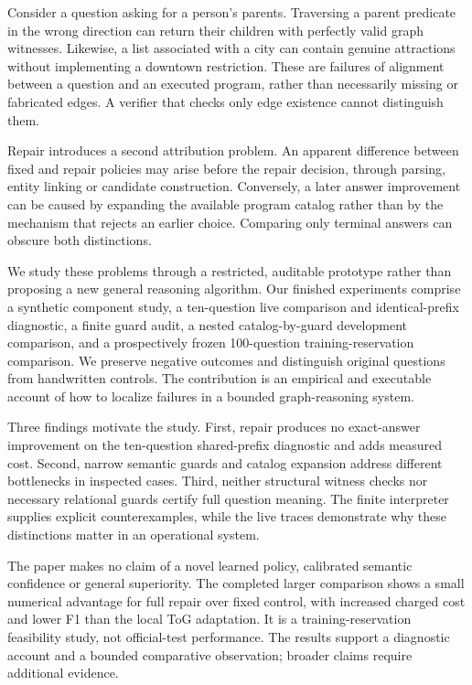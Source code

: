 \documentclass[10pt]{article}
\begin{document}
Consider a question asking for a person's parents. Traversing a parent predicate in the wrong direction can return their children with perfectly valid graph witnesses. Likewise, a list associated with a city can contain genuine attractions without implementing a downtown restriction. These are failures of alignment between a question and an executed program, rather than necessarily missing or fabricated edges. A verifier that checks only edge existence cannot distinguish them.\par

Repair introduces a second attribution problem. An apparent difference between fixed and repair policies may arise before the repair decision, through parsing, entity linking or candidate construction. Conversely, a later answer improvement can be caused by expanding the available program catalog rather than by the mechanism that rejects an earlier choice. Comparing only terminal answers can obscure both distinctions.\par

We study these problems through a restricted, auditable prototype rather than proposing a new general reasoning algorithm. Our finished experiments comprise a synthetic component study, a ten-question live comparison and identical-prefix diagnostic, a finite guard audit, a nested catalog-by-guard development comparison, and a prospectively frozen 100-question training-reservation comparison. We preserve negative outcomes and distinguish original questions from handwritten controls. The contribution is an empirical and executable account of how to localize failures in a bounded graph-reasoning system.\par

Three findings motivate the study. First, repair produces no exact-answer improvement on the ten-question shared-prefix diagnostic and adds measured cost. Second, narrow semantic guards and catalog expansion address different bottlenecks in inspected cases. Third, neither structural witness checks nor necessary relational guards certify full question meaning. The finite interpreter supplies explicit counterexamples, while the live traces demonstrate why these distinctions matter in an operational system.\par

The paper makes no claim of a novel learned policy, calibrated semantic confidence or general superiority. The completed larger comparison shows a small numerical advantage for full repair over fixed control, with increased charged cost and lower F1 than the local ToG adaptation. It is a training-reservation feasibility study, not official-test performance. The results support a diagnostic account and a bounded comparative observation; broader claims require additional evidence.\par
\end{document}
